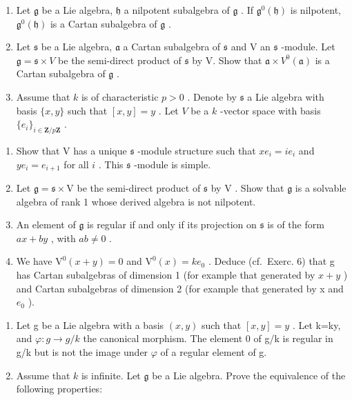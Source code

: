 \begin{enumerate}
\def\labelenumi{\arabic{enumi})}
\setcounter{enumi}{5}
\item
  Let \(\mathfrak{g}\) be a Lie algebra, \(\mathfrak{h}\) a nilpotent subalgebra of \(\mathfrak{g}\) . If \(\mathfrak{g}^0 (\mathfrak{h})\) is nilpotent, \(\mathfrak{g}^0 (\mathfrak{h})\) is a Cartan subalgebra of \(\mathfrak{g}\) .
\item
  Let \(\mathfrak{s}\) be a Lie algebra, \(\mathfrak{a}\) a Cartan subalgebra of \(\mathfrak{s}\) and V an \(\mathfrak{s}\) -module. Let \(\mathfrak{g} = \mathfrak{s} \times V\) be the semi-direct product of \(\mathfrak{s}\) by V. Show that \(\mathfrak{a} \times V^0(\mathfrak{a})\) is a Cartan subalgebra of \(\mathfrak{g}\) .
\item
  Assume that \(k\) is of characteristic \(p > 0\) . Denote by \(\mathfrak{s}\) a Lie algebra with basis \(\{x, y\}\) such that \([x, y] = y\) . Let \(V\) be a \(k\) -vector space with basis \(\{e_i\}_{i \in \mathbf{Z}/p\mathbf{Z}}\) .
\end{enumerate}

\begin{enumerate}
\def\labelenumi{\alph{enumi})}
\item
  Show that V has a unique \(\mathfrak{s}\) -module structure such that \(xe_{i} = ie_{i}\) and \(ye_{i} = e_{i + 1}\) for all \(i\) . This \(\mathfrak{s}\) -module is simple.
\item
  Let \(\mathfrak{g} = \mathfrak{s} \times \mathrm{V}\) be the semi-direct product of \(\mathfrak{s}\) by \(\mathrm{V}\) . Show that \(\mathfrak{g}\) is a solvable algebra of rank 1 whose derived algebra is not nilpotent.
\item
  An element of \(\mathfrak{g}\) is regular if and only if its projection on \(\mathfrak{s}\) is of the form \(ax + by\) , with \(ab \neq 0\) .
\item
  We have \(\mathrm{V}^{0}(x+y)=0\) and \(\mathrm{V}^{0}(x)=ke_{0}\) . Deduce (cf.~Exerc. 6) that g has Cartan subalgebras of dimension 1 (for example that generated by \(x+y\) ) and Cartan subalgebras of dimension 2 (for example that generated by x and \(e_{0}\) ).
\end{enumerate}

\begin{enumerate}
\def\labelenumi{\arabic{enumi})}
\setcounter{enumi}{8}
\item
  Let g be a Lie algebra with a basis \((x,y)\) such that \([x,y]=y\) . Let k=ky, and \(\varphi:g\to g/k\) the canonical morphism. The element 0 of g/k is regular in g/k but is not the image under \(\varphi\) of a regular element of g.
\item
  Assume that \(k\) is infinite. Let \(\mathfrak{g}\) be a Lie algebra. Prove the equivalence of the following properties:
\end{enumerate}


